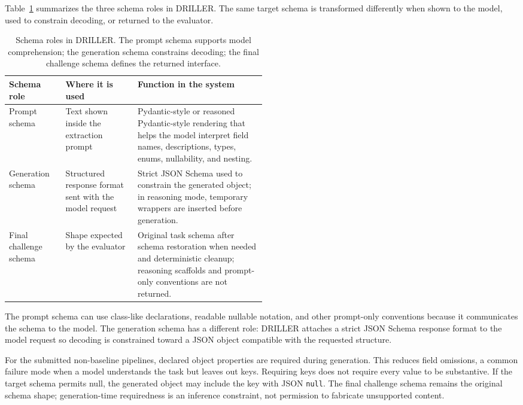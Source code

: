 Table~\ref{tab:schema-roles} summarizes the three schema roles in DRILLER. The same target schema is transformed differently when shown to the model, used to constrain decoding, or returned to the evaluator.

\begin{table}[!htbp]
\centering
\small
\caption{Schema roles in DRILLER. The prompt schema supports model comprehension; the generation schema constrains decoding; the final challenge schema defines the returned interface.}
\label{tab:schema-roles}
\begin{tabularx}{\linewidth}{@{}>{\raggedright\arraybackslash}p{0.22\linewidth}
>{\raggedright\arraybackslash}p{0.28\linewidth}
>{\raggedright\arraybackslash}X@{}}
\toprule
Schema role & Where it is used & Function in the system \\
\midrule
Prompt schema &
Text shown inside the extraction prompt &
Pydantic-style or reasoned Pydantic-style rendering that helps the model interpret field names, descriptions, types, enums, nullability, and nesting. \\
Generation schema &
Structured response format sent with the model request &
Strict JSON Schema used to constrain the generated object; in reasoning mode, temporary wrappers are inserted before generation. \\
Final challenge schema &
Shape expected by the evaluator &
Original task schema after schema restoration when needed and deterministic cleanup; reasoning scaffolds and prompt-only conventions are not returned. \\
\bottomrule
\end{tabularx}
\end{table}

\FloatBarrier

The prompt schema can use class-like declarations, readable nullable notation, and other prompt-only conventions because it communicates the schema to the model. The generation schema has a different role: DRILLER attaches a strict JSON Schema response format to the model request so decoding is constrained toward a JSON object compatible with the requested structure.

For the submitted non-baseline pipelines, declared object properties are required during generation. This reduces field omissions, a common failure mode when a model understands the task but leaves out keys. Requiring keys does not require every value to be substantive. If the target schema permits null, the generated object may include the key with JSON \texttt{null}. The final challenge schema remains the original schema shape; generation-time requiredness is an inference constraint, not permission to fabricate unsupported content.

